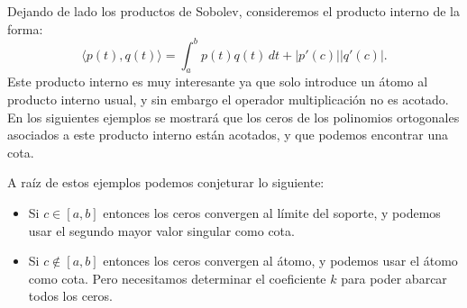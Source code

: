 Dejando de lado los productos de Sobolev, consideremos el producto interno de la forma:
$$\langle p(t),q(t) \rangle = \int_{a}^{b} p(t) q(t) \, dt + |p'(c)||q'(c)|.$$
Este producto interno es muy interesante ya que solo introduce un átomo al producto interno usual, y sin embargo el operador multiplicación no es acotado. En los siguientes ejemplos se mostrará que los ceros de los polinomios ortogonales asociados a este producto interno están acotados, y que podemos encontrar una cota.

A raíz de estos ejemplos podemos conjeturar lo siguiente:

\begin{itemize}
	\item Si $c \in [a,b]$ entonces los ceros convergen al límite del soporte, y podemos usar el segundo mayor valor singular como cota.
	\item Si $c \notin [a,b]$ entonces los ceros convergen al átomo, y podemos usar el átomo como cota. Pero necesitamos determinar el coeficiente $k$ para poder abarcar todos los ceros.
\end{itemize}